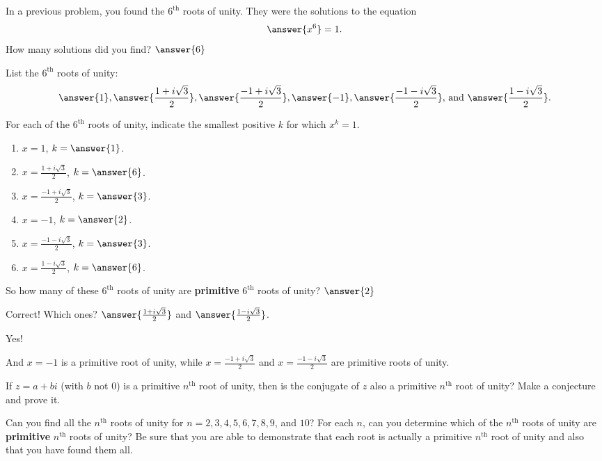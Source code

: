 \documentclass[space,nooutcomes]{ximera}
\begin{document}
\begin{problem}
In a previous problem, you found the $6^\text{th}$ roots of unity.  They were the solutions to the equation
\[
\answer{x^6} = 1.  
\]
How many solutions did you find?  $\answer{6}$
\begin{problem}
List the $6^\text{th}$ roots of unity: 
\[
\answer{1}, \answer{\frac{1+i\sqrt{3}}{2}}, \answer{\frac{-1+i\sqrt{3}}{2}}, 
\answer{-1}, \answer{\frac{-1-i\sqrt{3}}{2}}\text{, and }\answer{\frac{1-i\sqrt{3}}{2}}. 
\]
\begin{problem}
For each of the $6^\text{th}$ roots of unity, indicate the smallest positive $k$ for which $x^k = 1$.  
\begin{enumerate}
\item $x=1$, $k=\answer{1}$.  
\item $x=\frac{1+i\sqrt{3}}{2}$, $k=\answer{6}$.
\item $x=\frac{-1+i\sqrt{3}}{2}$, $k=\answer{3}$.
\item $x=-1$, $k=\answer{2}$.  
\item $x=\frac{-1-i\sqrt{3}}{2}$, $k=\answer{3}$.
\item $x=\frac{1-i\sqrt{3}}{2}$, $k=\answer{6}$.
\end{enumerate}
So how many of these $6^\text{th}$ roots of unity are \textbf{primitive} $6^\text{th}$ roots of unity?  
$\answer{2}$
\begin{problem}
Correct!  Which ones?  $\answer{\frac{1+i\sqrt{3}}{2}}$ and $\answer{\frac{1-i\sqrt{3}}{2}}$.  
\begin{problem}
Yes!  

And $x=-1$ is a primitive  root of unity,  
while $x=\frac{-1+i\sqrt{3}}{2}$ and $x=\frac{-1-i\sqrt{3}}{2}$ are primitive  roots of unity. 
\end{problem}
\end{problem}
\end{problem}
\end{problem}
\end{problem}

\begin{problem}
If $z = a + bi$ (with $b$ not $0$) is a primitive $n^\text{th}$ root of unity, then is the conjugate of $z$ also a primitive $n^\text{th}$ root of unity?  Make a conjecture and prove it.
\vfill 
\end{problem}


\begin{problem}
Can you find all the $n^\text{th}$ roots of unity for $n = 2, 3, 4, 5, 6, 7, 8, 9$, and $10$?  For each $n$, can you determine which of the $n^\text{th}$ roots of unity are \textbf{primitive} $n^\text{th}$ roots of unity?  Be sure that you are able to demonstrate that each root is actually a primitive $n^\text{th}$ root of unity and also that you have found them all.  
\end{problem}
\end{document}
